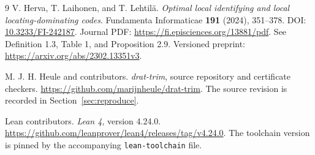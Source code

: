 \documentclass[11pt]{article}
\begin{document}
{\small
\begin{thebibliography}{9}
V. Herva, T. Laihonen, and T. Lehtil\"a.
\emph{Optimal local identifying and local locating-dominating codes}.
Fundamenta Informaticae \textbf{191} (2024), 351--378.
DOI: \href{https://doi.org/10.3233/FI-242187}{10.3233/FI-242187}.
Journal PDF: \url{https://fi.episciences.org/13881/pdf}.
See Definition 1.3, Table 1, and Proposition 2.9.
Versioned preprint: \url{https://arxiv.org/abs/2302.13351v3}.

M. J. H. Heule and contributors.
\emph{drat-trim}, source repository and certificate checkers.
\url{https://github.com/marijnheule/drat-trim}.
The source revision is recorded in Section~\ref{sec:reproduce}.

Lean contributors.
\emph{Lean 4}, version 4.24.0.
\url{https://github.com/leanprover/lean4/releases/tag/v4.24.0}.
The toolchain version is pinned by the accompanying \texttt{lean-toolchain} file.
\end{thebibliography}
}
\end{document}
